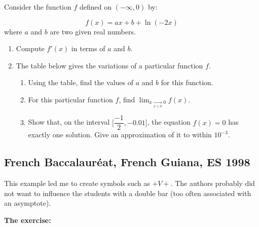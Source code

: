 \begin{tkzexample}
	Consider the function $f$ defined on $(-\infty, 0)$ by:

	\[
	  f(x)=ax+b+\ln(-2x)
	\]
	where $a$ and $b$ are two given real numbers.

	\begin{enumerate}
	\item Compute $f'(x)$ in terms of $a$ and $b$.
	\item The table below gives the variations of a particular function $f$.

	\medskip
	\begin{center}
	\end{center}

	\medskip
	\begin{enumerate}
	\item Using the table, find the values of $a$ and $b$ for
	 this function.
	\item For this particular function $f$, find
	        $\displaystyle \lim_{x \xrightarrow[x<0]{} 0} f(x)$.
	\item Show that, on the interval $\Big[\dfrac{-1}{2}, -0.01\Big]$, the equation $f(x)=0$
	 has exactly one solution. Give an approximation of it to within $10^{-3}$.
	\end{enumerate}
	\end{enumerate}
\end{tkzexample}



\subsection{French Baccalauréat, French Guiana, ES 1998}
This example led me to create symbols such as $+V+$. The authors probably did not want to influence the students with a double bar (too often associated with an asymptote).

\textbf{The exercise:}

